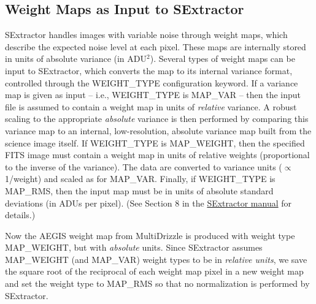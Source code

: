 \documentclass[a4paper,11pt]{article}
\begin{document}
%


\newpage
\begin{appendices}
\section{Weight Maps as Input to SExtractor} \label{App:weight}
SExtractor handles images with variable noise through weight maps, which describe the expected noise level at each pixel. These maps are internally stored in units of absolute variance (in ADU$^2$). Several types of weight maps can be input to SExtractor, which converts the map to its internal variance format, controlled through the WEIGHT\_TYPE configuration keyword. If a variance map is given as input -- i.e., WEIGHT\_TYPE is MAP\_VAR -- then the input file is assumed to contain a weight map in units of {\em relative} variance. A robust scaling to the appropriate {\em absolute} variance is then performed by comparing this variance map to an internal, low-resolution, absolute variance map built from the science image itself. 
If WEIGHT\_TYPE is MAP\_WEIGHT, then the specified FITS image must contain a weight map in units of relative weights (proportional to the inverse of the variance). The data are converted to variance units ($\propto$ 1/weight) and scaled as for MAP\_VAR. 
Finally, if WEIGHT\_TYPE is MAP\_RMS, then the input map must be in units of absolute standard deviations (in ADUs per pixel). (See Section 8 in the  \href{http://www.astromatic.net/pubsvn/software/sextractor/trunk/doc/sextractor.pdf}{SExtractor manual} for details.)

Now the AEGIS weight map from MultiDrizzle is produced with weight type MAP\_WEIGHT, but with {\em absolute} units. Since  SExtractor assumes MAP\_WEIGHT (and MAP\_VAR) weight types to be in {\em relative units}, 
we save the square root of the reciprocal of each weight map pixel in a new weight map and set the weight type to MAP\_RMS so that 
no normalization is performed by SExtractor. 
\end{appendices}
\end{document}

